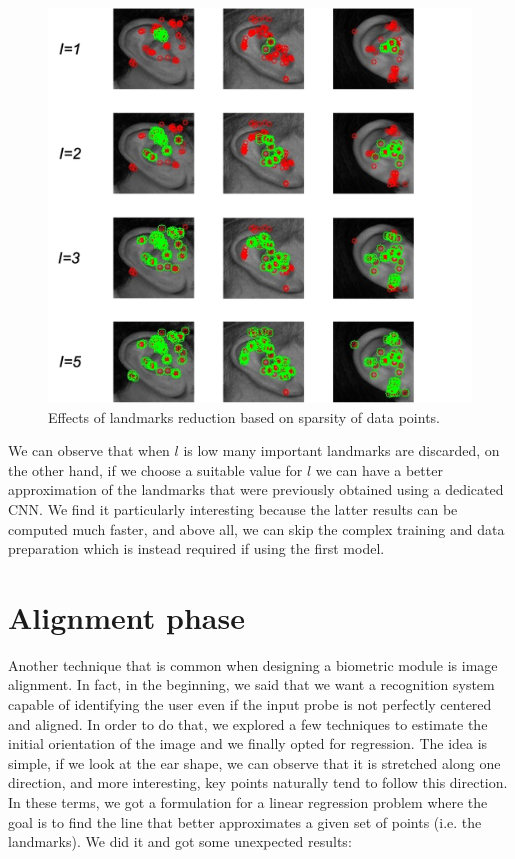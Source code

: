 \documentclass{article}
\begin{document}
\begin{figure}[h]
    \label{fig:landmark_orb_reduced}
    \begin{center}
        \includegraphics[width=14cm,keepaspectratio]{images/landmark_orb_reduced.png}
        \caption{Effects of landmarks reduction based on sparsity of data points.}
    \end{center}
\end{figure}

We can observe that when $l$ is low many important landmarks are discarded, on the other hand,
if we choose a suitable value for $l$ we can have a better approximation of the landmarks that were previously
obtained using a dedicated CNN. We find it particularly interesting because the latter results can be computed
much faster, and above all, we can skip the complex training and data preparation which is instead required if
using the first model.

\section{Alignment phase}

Another technique that is common when designing a biometric module is image alignment. In fact,
in the beginning, we said that we want a recognition system capable of identifying the user even if the
input probe is not perfectly centered and aligned. In order to do that, we explored a few techniques to
estimate the initial orientation of the image and we finally opted for regression. The idea is simple, if
we look at the ear shape, we can observe that it is stretched along one direction, and more interesting,
key points naturally tend to follow this direction. In these terms, we got a formulation for a linear
regression problem where the goal is to find the line that better approximates a given set of points
(i.e. the landmarks). We did it and got some unexpected results:
\end{document}
